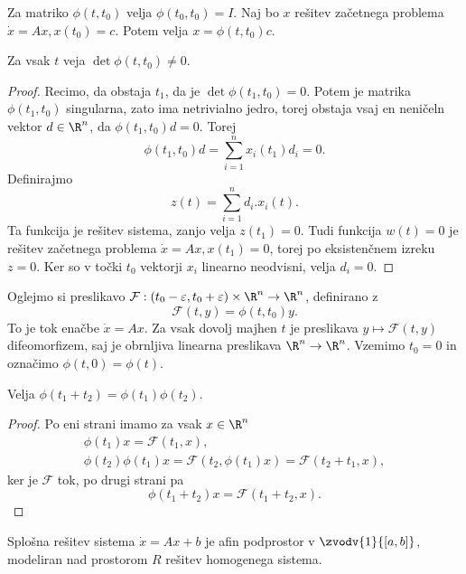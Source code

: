 Za matriko $\phi(t,t_0)$ velja $\phi(t_0,t_0) = I$.
Naj bo $x$ rešitev začetnega problema $\dot{x} = Ax, x(t_0) = c$.
Potem velja $x = \phi(t,t_0)c$.

\begin{trditev}
  Za vsak $t$ veja $\det \phi(t,t_0) \ne 0$.
\end{trditev}

\begin{proof}
  Recimo, da obstaja $t_1$, da je $\det \phi(t_1, t_0) = 0$.
  Potem je matrika $\phi(t_1, t_0)$ singularna, zato ima netrivialno jedro,
  torej obstaja vsaj en neničeln vektor $d \in \R^n$, da $\phi(t_1, t_0) d = 0$.
  Torej
  \[
	\phi(t_1, t_0) d = \sum_{i=1}^n x_i(t_1) d_i = 0.
  \]
  Definirajmo
  \[
	z(t) = \sum_{i=1}^n d_i . x_i(t).
  \]
  Ta funkcija je rešitev sistema, zanjo velja $z(t_1) = 0$.
  Tudi funkcija $w(t) = 0$ je rešitev začetnega problema $\dot{x} = Ax, x(t_1) =
  0$, torej po eksistenčnem izreku $z = 0$.
  Ker so v točki $t_0$ vektorji $x_i$ linearno neodvisni, velja $d_i = 0$.
\end{proof}


Oglejmo si preslikavo $\mathcal{F}: (t_0-\varepsilon, t_0+\varepsilon) \times
\R^n \to \R^n$, definirano z
\[
  \mathcal{F}(t, y) = \phi(t, t_0) y.
\]
To je tok enačbe $\dot{x} = Ax$.
Za vsak dovolj majhen $t$ je preslikava $y \mapsto \mathcal{F}(t,y)$
difeomorfizem, saj je obrnljiva linearna preslikava $\R^n \to \R^n$.
Vzemimo $t_0 = 0$ in označimo $\phi(t,0) = \phi(t)$.

\begin{trditev}
  Velja $\phi(t_1 + t_2) = \phi(t_1) \phi(t_2)$.
\end{trditev}

\begin{proof}
  Po eni strani imamo za vsak $x \in \R^n$
  \begin{gather*}
	\phi(t_1) x = \mathcal{F}(t_1,x), \\
	\phi(t_2) \phi(t_1)x = \mathcal{F}(t_2, \phi(t_1) x) = \mathcal{F}(t_2 +
	t_1, x),
  \end{gather*}
  ker je $\mathcal{F}$ tok, po drugi strani pa
  \[
	\phi(t_1 + t_2) x = \mathcal{F}(t_1+t_2,x).
  \]
\end{proof}


\begin{trditev}
  Splošna rešitev sistema $\dot{x} = Ax + b$ je afin podprostor v
  $\zvodv{1}{[a,b]}$, modeliran nad prostorom $R$ rešitev homogenega sistema.
\end{trditev}

